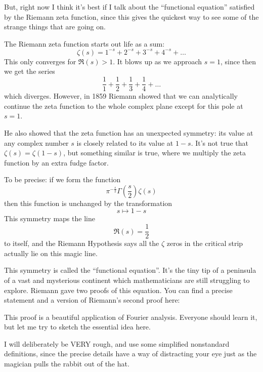 \documentclass{article}
\def\tightlist{}
\renewcommand{\texttt}[1]{%
  \begingroup
  \ttfamily
  \begingroup\lccode`~=`/\lowercase{\endgroup\def~}{/\discretionary{}{}{}}%
  \begingroup\lccode`~=`[\lowercase{\endgroup\def~}{[\discretionary{}{}{}}%
  \begingroup\lccode`~=`.\lowercase{\endgroup\def~}{.\discretionary{}{}{}}%
  \catcode`/=\active\catcode`[=\active\catcode`.=\active
  \scantokens{#1\noexpand}%
  \endgroup
}
\begin{document}
But, right now I think it's best if I talk about the ``functional
equation'' satisfied by the Riemann zeta function, since this gives the
quickest way to see some of the strange things that are going on.

The Riemann zeta function starts out life as a sum:
\[\zeta(s) = 1^{-s} + 2^{-s} + 3^{-s} + 4^{-s} + \ldots\] This only
converges for \(\Re(s) > 1\). It blows up as we approach \(s = 1\),
since then we get the series
\[\frac11 + \frac12 + \frac13 + \frac14 + \ldots\] which diverges.
However, in 1859 Riemann showed that we can analytically continue the
zeta function to the whole complex plane except for this pole at
\(s = 1\).

He also showed that the zeta function has an unexpected symmetry: its
value at any complex number \(s\) is closely related to its value at
\(1-s\). It's not true that \(\zeta(s) = \zeta(1-s)\), but something
similar is true, where we multiply the zeta function by an extra fudge
factor.

To be precise: if we form the function
\[\pi ^{-\frac{s}{2}} \Gamma\left(\frac{s}{2}\right) \zeta(s)\] then
this function is unchanged by the transformation \[s \mapsto 1 - s\]
This symmetry maps the line \[\Re(s) = \frac12\] to itself, and the
Riemann Hypothesis says all the \(\zeta\) zeros in the critical strip
actually lie on this magic line.

This symmetry is called the ``functional equation''. It's the tiny tip
of a peninsula of a vast and mysterious continent which mathematicians
are still struggling to explore. Riemann gave two proofs of this
equation. You can find a precise statement and a version of Riemann's
second proof here:


This proof is a beautiful application of Fourier analysis. Everyone
should learn it, but let me try to sketch the essential idea here.

I will deliberately be VERY rough, and use some simplified nonstandard
definitions, since the precise details have a way of distracting your
eye just as the magician pulls the rabbit out of the hat.
\end{document}
